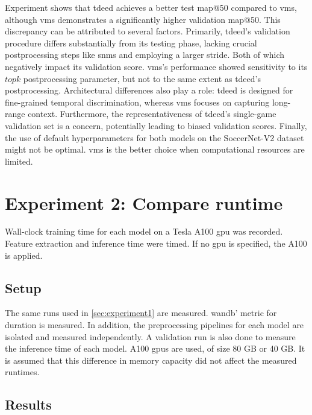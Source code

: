 Experiment shows that \acrshort{tdeed} achieves a better test \acrshort{map}@50 compared to \acrshort{vms}, although \acrshort{vms} demonstrates a significantly higher validation \acrshort{map}@50. This discrepancy can be attributed to several factors. Primarily, \acrshort{tdeed}'s validation procedure differs substantially from its testing phase, lacking crucial postprocessing steps like \acrfull{snms} and employing a larger stride. Both of which negatively impact its validation score. \acrshort{vms}'s performance showed sensitivity to its $topk$ postprocessing parameter, but not to the same extent as \acrshort{tdeed}'s postprocessing. Architectural differences also play a role: \acrshort{tdeed} is designed for fine-grained temporal discrimination, whereas \acrshort{vms} focuses on capturing long-range context. Furthermore, the representativeness of \acrshort{tdeed}'s single-game validation set is a concern, potentially leading to biased validation scores. Finally, the use of default hyperparameters for both models on the SoccerNet-V2 dataset might not be optimal. \acrshort{vms} is the better choice when computational resources are limited.

\section{Experiment 2: Compare runtime}
\label{sec:experiment2}

Wall-clock training time for each model on a Tesla A100 \acrshort{gpu} was recorded. Feature extraction and inference time were timed. If no \acrshort{gpu} is specified, the A100 is applied. 

\subsection{Setup}
\label{ssec:ex2_setup}

The same runs used in \autoref{sec:experiment1} are measured. \acrlong{wandb}' metric for duration is measured. In addition, the preprocessing pipelines for each model are isolated and measured independently. A validation run is also done to measure the inference time of each model. A100 \acrshort{gpu}s are used, of size 80 GB or 40 GB. It is assumed that this difference in memory capacity did not affect the measured runtimes. 

\subsection{Results}
\label{ssec:ex2_result}

